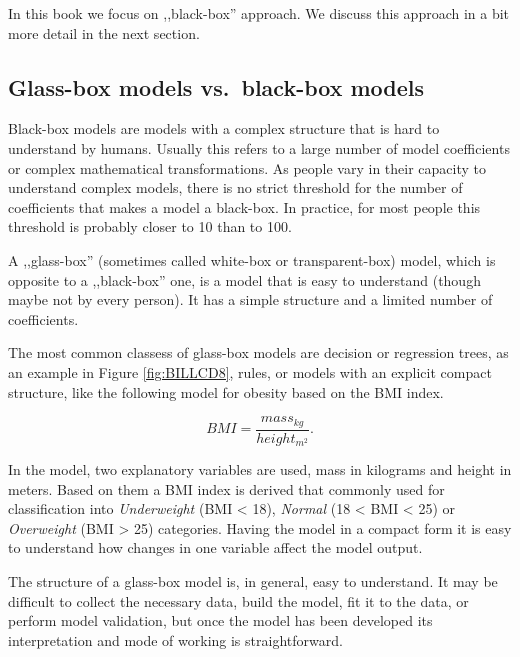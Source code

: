 \documentclass[12pt,]{krantz}
\begin{document}
In this book we focus on ,,black-box'' approach. We discuss this approach in a bit more detail in the next section.

\hypertarget{glass-box-models-vs.black-box-models}{%
\subsection{Glass-box models vs.~black-box models}\label{glass-box-models-vs.black-box-models}}

Black-box models are models with a complex structure that is hard to understand by humans. Usually this refers to a large number of model coefficients or complex mathematical transformations. As people vary in their capacity to understand complex models, there is no strict threshold for the number of coefficients that makes a model a black-box. In practice, for most people this threshold is probably closer to 10 than to 100.

A ,,glass-box'' (sometimes called white-box or transparent-box) model, which is opposite to a ,,black-box'' one, is a model that is easy to understand (though maybe not by every person). It has a simple structure and a limited number of coefficients.

The most common classess of glass-box models are decision or regression trees, as an example in Figure \ref{fig:BILLCD8}, rules, or models with an explicit compact structure, like the following model for obesity based on the BMI index.

\[
BMI = \frac{mass_{kg}}{height_{m^2}}.
\]

In the model, two explanatory variables are used, mass in kilograms and height in meters. Based on them a BMI index is derived that commonly used for classification into \emph{Underweight} (BMI \textless{} 18), \emph{Normal} (18 \textless{} BMI \textless{} 25) or \emph{Overweight} (BMI \textgreater{} 25) categories. Having the model in a compact form it is easy to understand how changes in one variable affect the model output.

The structure of a glass-box model is, in general, easy to understand. It may be difficult to collect the necessary data, build the model, fit it to the data, or perform model validation, but once the model has been developed its interpretation and mode of working is straightforward.
\end{document}
